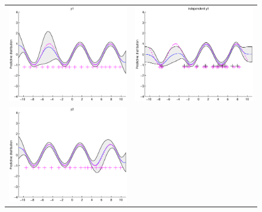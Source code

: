 \documentclass{article} %
\begin{document}
\begin{figure}
\centering
\begin{tabular}{cc}
\includegraphics[scale=0.5]{figures/ssvi-y1.eps} &
\includegraphics[scale=0.5]{figures/ssvi-svi1.eps} \\
\includegraphics[scale=0.5]{figures/ssvi-y2.eps} &

\end{tabular}
\end{figure}
\end{document}
